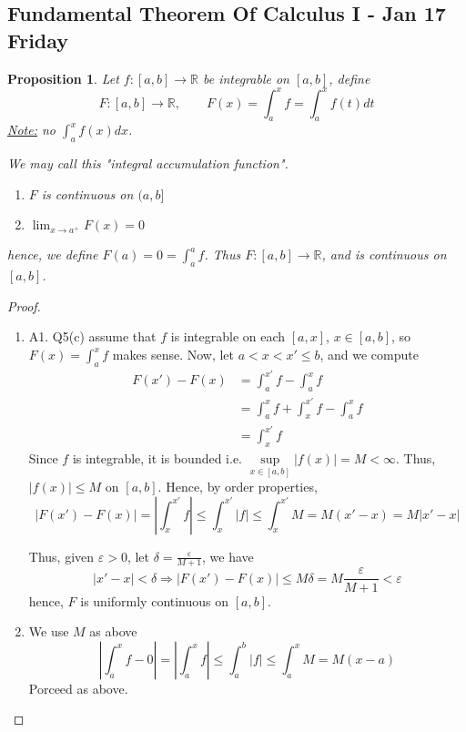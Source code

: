 \documentclass[12pt]{article}
\theoremstyle{plain}
\newtheorem{proposition}{Proposition}[subsection]
\newcommand{\abs}[1]{\left| #1 \right|}
\newcommand{\mR}{{\mathbb{R}}}
\newcommand{\ep}{\varepsilon}
\begin{document}
		\subsection{Fundamental Theorem Of Calculus I - Jan 17 Friday}
	\begin{proposition}
		Let $f:[a,b]\to\mR$ be integrable on $[a,b]$, define
		\[
			F:[a,b] \to \mR, \qquad F(x) = \int_a^x f = \int_a^x f(t)dt
		\]
	\underline{Note:} no $\int_a^x f(x) dx$. 

		We may call this "integral accumulation function". 
		\begin{enumerate}
			\item $F$ is continuous on $(a,b]$
			\item $\lim_{x\to a^+} F(x) = 0$
		\end{enumerate}
		hence, we define $F(a) = 0 =\int_a^a f$. Thus $F:[a,b] \to \mR$, 
		and is continuous on $[a,b]$. 
	\end{proposition}
	\begin{proof}
		$ $
		\begin{enumerate}
			\item A1. Q5(c) assume that $f$ is integrable on each $[a,x]$, 
				$x\in [a,b]$, so $F(x) = \int_a^x f$ makes sense. Now, let 
				$a<x<x'\leq b$, and we compute 
				\begin{align*}
					F(x')-F(x) 
					&= \int_a^{x'} f - \int_a^x f\\
					&= \int_a^x f + \int_x^{x'} f -\int_a^x f 
					\tag{additivity}\\
					&= \int_x^{x'} f
				\end{align*}
				Since $f$ is integrable, it is bounded i.e. 
				$\underset{x\in [a,b]}{\sup} \abs{f(x)} = M < \infty$. 
				Thus, $\abs{f(x)} \leq M$ on $[a,b]$. Hence, by order 
				properties, 
				\[
					\abs{F(x') - F(x)} 
					= \abs{\int_x^{x'}f} \leq \int_x^{x'} \abs f
					\leq \int_x^{x'}M= M(x'-x) = M\abs{x'-x}
				\]	
				
				Thus, given $\ep>0$, let $\delta=\frac{\ep}{M+1}$, we have
				\[
					\abs{x'-x}<\delta \Rightarrow \abs{F(x')-F(x)} \leq M\delta
					=M\frac{\ep}{M+1} < \ep
				\]
				hence, $F$ is uniformly continuous on $[a,b]$. 
			\item We use $M$ as above
				\[
					\abs{\int_a^x f -0} = \abs{\int_a^x f} \leq \int_a^b\abs f
					\leq \int_a^x M = M(x-a)
				\]
				Porceed as above.\\
		\end{enumerate}
	\end{proof}
\end{document}
